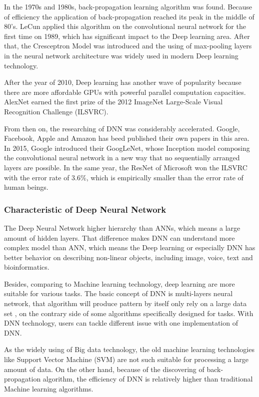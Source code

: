 \documentclass[article]{aaltoseries}
\begin{document}
In the 1970s and 1980s, back-propagation learning algorithm was found. Because of efficiency the application of back-propagation
reached its peak in the middle of 80's. LeCun applied this algorithm on the convolutional neural network 
for the first time on 1989, which has significant impact to the Deep learning area. After that, the Cresceptron Model was introduced
and the using of max-pooling layers in the neural network architecture was widely used in modern Deep learning technology.

After the year of 2010, Deep learning has another wave of popularity because there are more affordable GPUs with powerful 
parallel computation capacities. AlexNet\cite{NIPS2012_4824} earned the first prize of 
the 2012 ImageNet Large-Scale Visual Recognition Challenge (ILSVRC). 

From then on, the researching of DNN was considerably accelerated. Google, Facebook, Apple and Amazon has beed published
their own papers in this area. In 2015, Google introduced their GoogLeNet\cite{GoogLeNet}, whose Inception model composing the convolutional 
neural network in a new way that no sequentially arranged layers are possible. In the same year, the ResNet\cite{ResNet} of Microsoft won 
the ILSVRC with the error rate of 3.6\%, which is empirically smaller than the error rate of human beings.




\subsubsection{Characteristic of Deep Neural Network}

The Deep Neural Network higher hierarchy than ANNs, which means a large amount of hidden layers\cite{MAL-006}. 
That difference makes DNN can understand more complex model than ANN, which means the Deep learning or especially DNN
has better behavior on describing non-linear objects, including image, voice, text and bioinformatics.

Besides, comparing to Machine learning technology, deep learning are more suitable for various tasks. The basic concept
of DNN is multi-layers neural network, that algorithm will produce pattern by itself only rely on a large data set
, on the contrary side of some algorithms specifically designed for tasks. With DNN technology, users can tackle different
issue with one implementation of DNN. 

As the widely using of Big data technology, the old machine learning technologies like Support Vector Machine (SVM) are
not such suitable for processing a large amount of data. On the other hand, because of the discovering of back-propagation
algorithm, the efficiency of DNN is relatively higher than traditional Machine learning algorithms.
\end{document}
